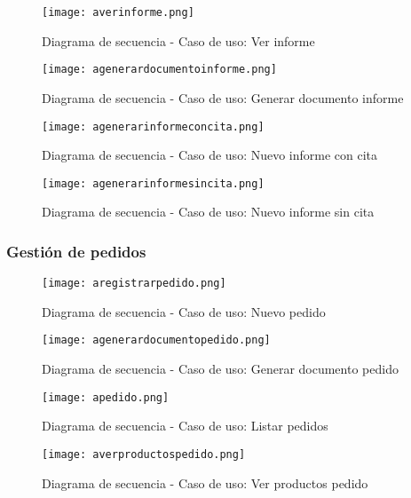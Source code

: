 \begin{figure}[!htb]
  \centering
    \texttt{[image: averinforme.png]}
  \caption{Diagrama de secuencia - Caso de uso: Ver informe   }
  \label{a}
\end{figure}

\begin{figure}[!htb]
  \centering
    \texttt{[image: agenerardocumentoinforme.png]}
  \caption{Diagrama de secuencia - Caso de uso: Generar documento informe   }
  \label{a}
\end{figure}

\begin{figure}[!htb]
  \centering
    \texttt{[image: agenerarinformeconcita.png]}
  \caption{Diagrama de secuencia - Caso de uso: Nuevo informe con cita   }
  \label{a}
\end{figure}

\begin{figure}[!htb]
  \centering
    \texttt{[image: agenerarinformesincita.png]}
  \caption{Diagrama de secuencia - Caso de uso: Nuevo informe sin cita  }
  \label{a}
\end{figure}

\clearpage
\subsubsection{Gestión de pedidos}
\begin{figure}[!htb]
  \centering
    \texttt{[image: aregistrarpedido.png]}
  \caption{Diagrama de secuencia - Caso de uso: Nuevo pedido }
  \label{a}
\end{figure}

\begin{figure}[!htb]
  \centering
    \texttt{[image: agenerardocumentopedido.png]}
  \caption{Diagrama de secuencia - Caso de uso: Generar documento pedido }
  \label{a}
\end{figure}

\begin{figure}[!htb]
  \centering
    \texttt{[image: apedido.png]}
  \caption{Diagrama de secuencia - Caso de uso: Listar pedidos }
  \label{a}
\end{figure}

\begin{figure}[!htb]
  \centering
    \texttt{[image: averproductospedido.png]}
  \caption{Diagrama de secuencia - Caso de uso: Ver productos pedido }
  \label{a}
\end{figure}

